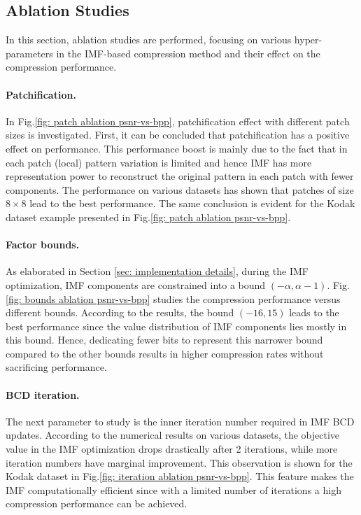 \subsection{Ablation Studies} \label{sec: ablation studies}
In this section, ablation studies are performed, focusing on various hyper-parameters in the IMF-based compression method and their effect on the compression performance. 

\paragraph{Patchification.} 
In Fig.\ref{fig: patch ablation psnr-vs-bpp}, patchification effect with different patch sizes is investigated.
First, it can be concluded that patchification has a positive effect on performance. 
This performance boost is mainly due to the fact that in each patch (local) pattern variation is limited and hence IMF has more representation power to reconstruct the original pattern in each patch with fewer components. The performance on various datasets has shown that patches of size $8\times 8$ lead to the best performance. The same conclusion is evident for the Kodak dataset example presented in Fig.\ref{fig: patch ablation psnr-vs-bpp}.

\paragraph{Factor bounds.} 
As elaborated in Section \ref{sec: implementation details}, during the IMF optimization, IMF components are constrained into a bound $(-\alpha,\alpha-1)$. Fig.\ref{fig: bounds ablation psnr-vs-bpp} studies the compression performance versus different bounds. According to the results, the bound $(-16,15)$ leads to the best performance since the value distribution of IMF components lies mostly in this bound. Hence, dedicating fewer bits to represent this narrower bound compared to the other bounds results in higher compression rates without sacrificing performance. 

\paragraph{BCD iteration.}
The next parameter to study is the inner iteration number required in IMF BCD updates. 
According to the numerical results on various datasets, the objective value in the IMF optimization drops drastically after 2 iterations, while more iteration numbers have marginal improvement. 
This observation is shown for the Kodak dataset in Fig.\ref{fig: iteration ablation psnr-vs-bpp}.
This feature makes the IMF computationally efficient since with a limited number of iterations a high compression performance can be achieved.

